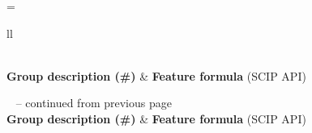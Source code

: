 \documentclass[letterpaper]{article} %
\begin{document}
\onecolumn
\begin{center}
\begin{footnotesize}
\LTcapwidth=\textwidth
\begin{longtable}{ll}
\caption{Description of the hand-crafted input features. Features are doubled [x2] when they are computed for both upward and downward branching directions. For features about open nodes, open\_lbs denotes the list of lower bound estimates of the open nodes, while open\_ds the list of depths across open nodes. Table continues on the next page.}
  \label{tab:features} \\
\toprule
\textbf{Group description (\#)} & \textbf{Feature formula} (SCIP API) \\
\midrule
\endfirsthead

%
{{\tablename\ \thetable{} -- continued from previous page}} \\
  \toprule 
  \textbf{Group description (\#)} & \textbf{Feature formula} (SCIP API) \\
  \midrule
\endhead

\hline \hline
\endlastfoot


\end{longtable}
\end{footnotesize}
\end{center}
\end{document}
